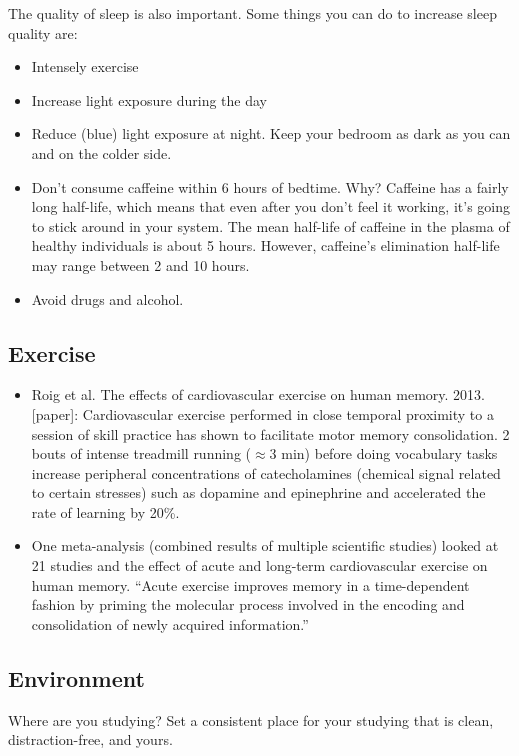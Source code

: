 The quality of sleep is also important. Some things you can do to increase sleep quality are: 
\begin{itemize}
	\item Intensely exercise
	\item Increase light exposure during the day
	\item Reduce (blue) light exposure at night. Keep your bedroom as dark as you can and on the colder side. 
	\item Don't consume caffeine within 6 hours of bedtime. Why? Caffeine has a fairly long half-life, which means that even after you don't feel it working, it's going to stick around in your system. The mean half-life of caffeine in the plasma of healthy individuals is about 5 hours. However, caffeine's elimination half-life may range between 2 and 10 hours.  
	\item Avoid drugs and alcohol.
\end{itemize}

\subsection{Exercise}

\begin{itemize}
	\item Roig et al. The effects of cardiovascular exercise on human memory. 2013. [paper]: Cardiovascular exercise performed in close temporal proximity to a session of skill practice has shown to facilitate motor memory consolidation. 2 bouts of intense treadmill running ($\approx 3$ min) before doing vocabulary tasks increase peripheral concentrations of catecholamines (chemical signal related to certain stresses) such as dopamine and epinephrine and accelerated the rate of learning by 20\%. 
	\item  One meta-analysis (combined results of multiple scientific studies) looked at 21 studies and the effect of acute and long-term cardiovascular exercise on human memory. ``Acute exercise improves memory in a time-dependent fashion by priming the molecular process involved in the encoding and consolidation of newly acquired information.''
\end{itemize}

\subsection{Environment}

Where are you studying? Set a consistent place for your studying that is clean, distraction-free, and yours. 

